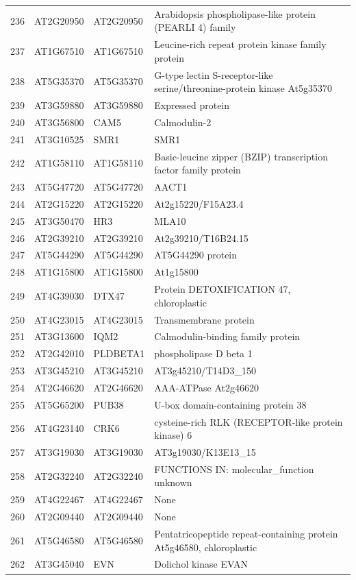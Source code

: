 \documentclass[11pt]{article}
\begin{document}
\begin{center}
\begin{tabular}{rlll}
236 & AT2G20950 & AT2G20950 & Arabidopsis phospholipase-like protein (PEARLI 4) family\\
237 & AT1G67510 & AT1G67510 & Leucine-rich repeat protein kinase family protein\\
238 & AT5G35370 & AT5G35370 & G-type lectin S-receptor-like serine/threonine-protein kinase At5g35370\\
239 & AT3G59880 & AT3G59880 & Expressed protein\\
240 & AT3G56800 & CAM5 & Calmodulin-2\\
241 & AT3G10525 & SMR1 & SMR1\\
242 & AT1G58110 & AT1G58110 & Basic-leucine zipper (BZIP) transcription factor family protein\\
243 & AT5G47720 & AT5G47720 & AACT1\\
244 & AT2G15220 & AT2G15220 & At2g15220/F15A23.4\\
245 & AT3G50470 & HR3 & MLA10\\
246 & AT2G39210 & AT2G39210 & At2g39210/T16B24.15\\
247 & AT5G44290 & AT5G44290 & AT5G44290 protein\\
248 & AT1G15800 & AT1G15800 & At1g15800\\
249 & AT4G39030 & DTX47 & Protein DETOXIFICATION 47, chloroplastic\\
250 & AT4G23015 & AT4G23015 & Transmembrane protein\\
251 & AT3G13600 & IQM2 & Calmodulin-binding family protein\\
252 & AT2G42010 & PLDBETA1 & phospholipase D beta 1\\
253 & AT3G45210 & AT3G45210 & AT3g45210/T14D3\_150\\
254 & AT2G46620 & AT2G46620 & AAA-ATPase At2g46620\\
255 & AT5G65200 & PUB38 & U-box domain-containing protein 38\\
256 & AT4G23140 & CRK6 & cysteine-rich RLK (RECEPTOR-like protein kinase) 6\\
257 & AT3G19030 & AT3G19030 & AT3g19030/K13E13\_15\\
258 & AT2G32240 & AT2G32240 & FUNCTIONS IN: molecular\_function unknown\\
259 & AT4G22467 & AT4G22467 & None\\
260 & AT2G09440 & AT2G09440 & None\\
261 & AT5G46580 & AT5G46580 & Pentatricopeptide repeat-containing protein At5g46580, chloroplastic\\
262 & AT3G45040 & EVN & Dolichol kinase EVAN\\

\end{tabular}
\end{center}
\end{document}
